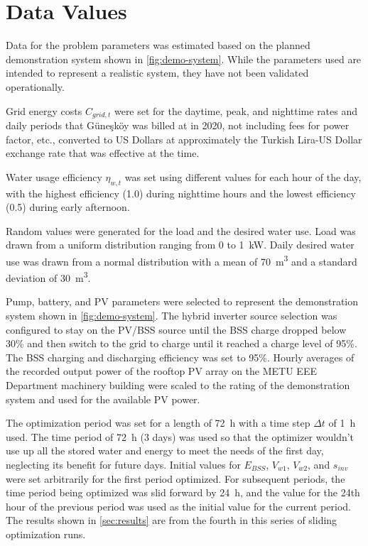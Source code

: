\section{Data Values}
\label{sec:data-values}

Data for the problem parameters was estimated based on the planned demonstration system shown in \cref{fig:demo-system}.
While the parameters used are intended to represent a realistic system, they have not been validated operationally.

Grid energy costs $C_{grid,t}$ were set for the daytime, peak, and nighttime rates and daily periods that Güneşköy was billed at in 2020, not including fees for power factor, etc., converted to US Dollars at approximately the Turkish Lira-US Dollar exchange rate that was effective at the time.

Water usage efficiency $\eta_{w,t}$ was set using different values for each hour of the day, with the highest efficiency (\num{1.0}) during nighttime hours and the lowest efficiency (\num{0.5}) during early afternoon.

Random values were generated for the load and the desired water use. Load was drawn from a uniform distribution ranging from 0 to \SI{1}{kW}.
Daily desired water use was drawn from a normal distribution with a mean of \SI{70}{m^3} and a standard deviation of \SI{30}{m^3}.

Pump, battery, and PV parameters were selected to represent the demonstration system shown in \cref{fig:demo-system}.
The hybrid inverter source selection was configured to stay on the PV/BSS source until the BSS charge dropped below 30\% and then switch to the grid to charge until it reached a charge level of 95\%.
The BSS charging and discharging efficiency was set to 95\%.
Hourly averages of the recorded output power of the rooftop PV array on the METU EEE Department machinery building were scaled to the rating of the demonstration system and used for the available PV power.

The optimization period was set for a length of \SI{72}{h} with a time step $\Delta t$ of \SI{1}{h} used. The time period of \SI{72}{h} (3 days) was used so that the optimizer wouldn't use up all the stored water and energy to meet the needs of the first day, neglecting its benefit for future days.
Initial values for $E_{BSS}$, $V_{w1}$, $V_{w2}$, and $s_{inv}$ were set arbitrarily for the first period optimized.
For subsequent periods, the time period being optimized was slid forward by \SI{24}{h}, and the value for the 24th hour of the previous period was used as the initial value for the current period.
The results shown in \cref{sec:results} are from the fourth in this series of sliding optimization runs.